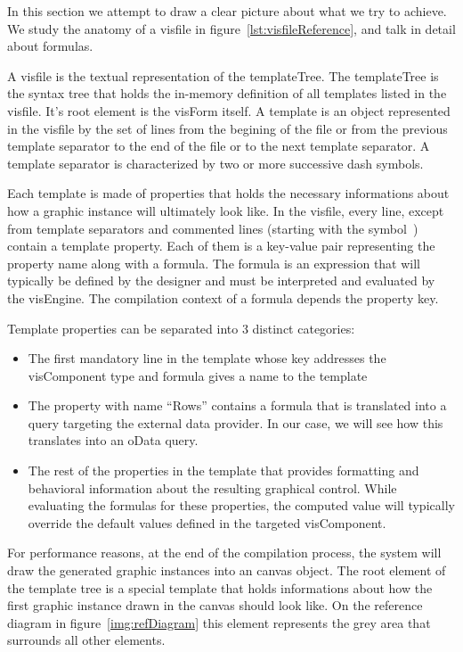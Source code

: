 In this section we attempt to draw a clear picture about what we try to achieve. We study the anatomy of a visfile in figure~\ref{lst:visfileReference}, and talk in detail about formulas.



A visfile is the textual representation of the templateTree. The templateTree is the syntax tree that holds the in-memory definition of all templates listed in the visfile. It's root element is the visForm itself. A template is an object represented in the visfile by the set of lines from the begining of the file or from the previous template separator to the end of the file or to the next template separator. A template separator is characterized by two or more successive dash symbols.

Each template is made of properties that holds the necessary informations about how a graphic instance will ultimately look like. In the visfile, every line, except from template separators and commented lines (starting with the symbol~\textquotesingle) contain a template property. Each of them is a key-value pair representing the property name along with a formula. The formula is an expression that will typically be defined by the designer and must be interpreted and evaluated by the visEngine. The compilation context of a formula depends the property key.

Template properties can be separated into 3 distinct categories:
\begin{itemize}
    \item The first mandatory line in the template whose key addresses the visComponent type and formula gives a name to the template 
    \item The property with name ``Rows'' contains a formula that is translated into a query targeting the external data provider. In our case, we will see how this translates into an oData query.
    \item The rest of the properties in the template that provides formatting and behavioral information about the resulting graphical control. While evaluating the formulas for these properties, the computed value will typically override the default values defined in the targeted visComponent.
\end{itemize}

For performance reasons, at the end of the compilation process, the system will draw the generated graphic instances into an canvas object. The root element of the template tree is a special template that holds informations about how the first graphic instance drawn in the canvas should look like. On the reference diagram in figure~\ref{img:refDiagram} this element represents the grey area that surrounds all other elements.

